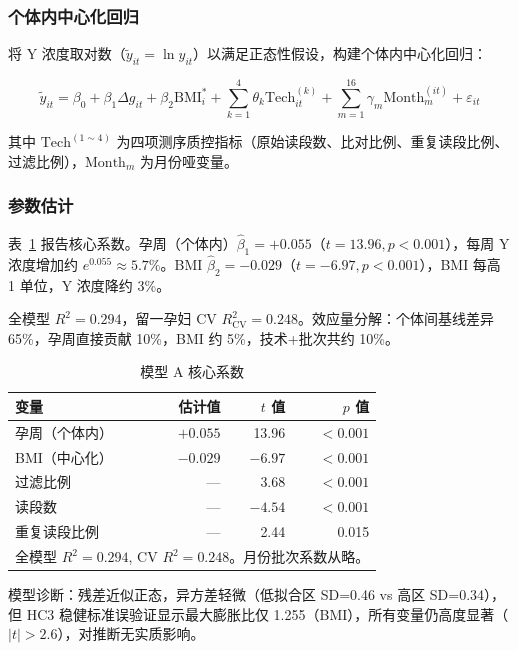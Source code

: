 \documentclass{mcm-paper}
\begin{document}
\subsubsection{个体内中心化回归}

将 Y 浓度取对数（$\tilde{y}_{it}=\ln y_{it}$）以满足正态性假设，构建个体内中心化回归：

\begin{equation}
\tilde{y}_{it} = \beta_0 + \beta_1 \Delta g_{it} + \beta_2 \mathrm{BMI}_i^* + \sum_{k=1}^{4} \theta_k \mathrm{Tech}_{it}^{(k)} + \sum_{m=1}^{16} \gamma_m \mathrm{Month}_m^{(it)} + \varepsilon_{it}
\label{eq:modelA}
\end{equation}

其中 $\mathrm{Tech}^{(1\sim4)}$ 为四项测序质控指标（原始读段数、比对比例、重复读段比例、过滤比例），$\mathrm{Month}_m$ 为月份哑变量。

\subsubsection{参数估计}

表~\ref{tab:coef-main} 报告核心系数。孕周（个体内）$\hat{\beta}_1=+0.055$（$t=13.96, p<0.001$），每周 Y 浓度增加约 $e^{0.055}\approx 5.7\%$。BMI $\hat{\beta}_2=-0.029$（$t=-6.97, p<0.001$），BMI 每高 1 单位，Y 浓度降约 3\%。

全模型 $R^2=0.294$，留一孕妇 CV $R^2_{\mathrm{CV}}=0.248$。效应量分解：个体间基线差异 65\%，孕周直接贡献 10\%，BMI 约 5\%，技术+批次共约 10\%。

\begin{table}[H]
\centering
\caption{模型 A 核心系数}
\label{tab:coef-main}
\begin{tabular}{lrrr}
\toprule
变量 & 估计值 & $t$ 值 & $p$ 值 \\
\midrule
孕周（个体内） & $+0.055$ & 13.96 & $<0.001$ \\
BMI（中心化）  & $-0.029$ & $-6.97$ & $<0.001$ \\
过滤比例       & —      & 3.68   & $<0.001$ \\
读段数         & —      & $-4.54$ & $<0.001$ \\
重复读段比例   & —      & 2.44   & 0.015 \\
\bottomrule
\multicolumn{4}{l}{\footnotesize 全模型 $R^2=0.294$, CV $R^2=0.248$。月份批次系数从略。} \\
\end{tabular}
\end{table}

模型诊断：残差近似正态，异方差轻微（低拟合区 SD=0.46 vs 高区 SD=0.34），但 HC3 稳健标准误验证显示最大膨胀比仅 1.255（BMI），所有变量仍高度显著（$|t|>2.6$），对推断无实质影响。
\end{document}
